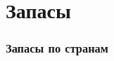 \section{Запасы}

\begin{frame}
    \frametitle{Запасы по странам}
    \begin{center}
    
    \end{center}
\end{frame}